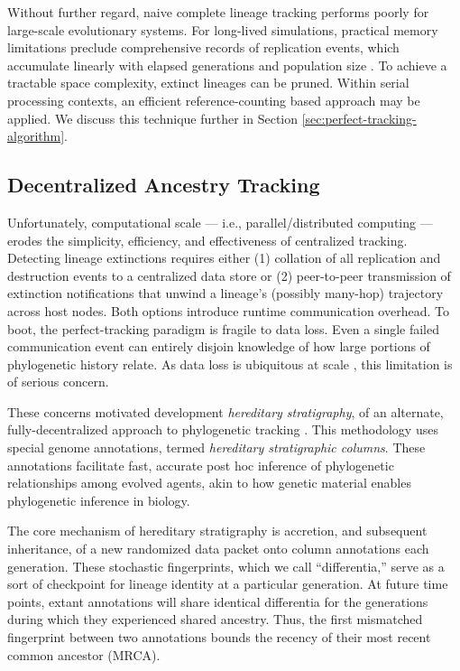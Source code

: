Without further regard, naive complete lineage tracking performs poorly for large-scale evolutionary systems.
For long-lived simulations, practical memory limitations preclude comprehensive records of replication events, which accumulate linearly with elapsed generations and population size \citep{dolson2023algorithms}.
To achieve a tractable space complexity, extinct lineages can be pruned.
Within serial processing contexts, an efficient reference-counting based approach may be applied.
We discuss this technique further in Section \ref{sec:perfect-tracking-algorithm}.

\subsection{Decentralized Ancestry Tracking}

Unfortunately, computational scale --- i.e., parallel/distributed computing --- erodes the simplicity, efficiency, and effectiveness of centralized tracking.
Detecting lineage extinctions requires either (1) collation of all replication and destruction events to a centralized data store or (2) peer-to-peer transmission of extinction notifications that unwind a lineage's (possibly many-hop) trajectory across host nodes.
Both options introduce runtime communication overhead.
To boot, the perfect-tracking paradigm is fragile to data loss.
Even a single failed communication event can entirely disjoin knowledge of how large portions of phylogenetic history relate.
As data loss is ubiquitous at scale \citep{cappello2014toward,ackley2011pursue}, this limitation is of serious concern.

These concerns motivated development \textit{hereditary stratigraphy}, of an alternate, fully-decentralized approach to phylogenetic tracking \citep{moreno2022hereditary}.
This methodology uses special genome annotations, termed \textit{hereditary stratigraphic columns}.
These annotations facilitate fast, accurate post hoc inference of phylogenetic relationships among evolved agents, akin to how genetic material enables phylogenetic inference in biology.

The core mechanism of hereditary stratigraphy is accretion, and subsequent inheritance, of a new randomized data packet onto column annotations each generation.
These stochastic fingerprints, which we call ``differentia,'' serve as a sort of checkpoint for lineage identity at a particular generation.
At future time points, extant annotations will share identical differentia for the generations during which they experienced shared ancestry.
Thus, the first mismatched fingerprint between two annotations bounds the recency of their most recent common ancestor (MRCA).

